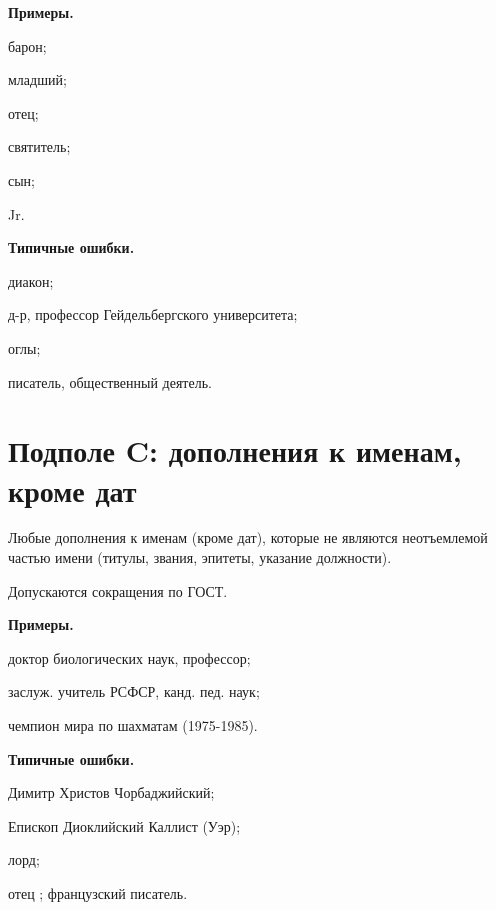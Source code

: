 \textbf{Примеры.}

\begin{cutelist}
    \item барон;
    \item младший;
    \item отец;
    \item святитель;
    \item сын;
    \item Jr.
\end{cutelist}

\textbf{Типичные ошибки.}

\begin{cutelist}
    \item диакон;
    \item д-р, профессор Гейдельбергского университета;
    \item оглы;
    \item писатель, общественный деятель.
\end{cutelist}

\section{Подполе C: дополнения к именам, кроме дат}

Любые дополнения к именам (кроме дат), которые не являются неотъемлемой частью имени (титулы, звания, эпитеты, указание должности).

Допускаются сокращения по ГОСТ.

\textbf{Примеры.}

\begin{cutelist}
    \item доктор биологических наук, профессор;
    \item заслуж. учитель РСФСР, канд. пед. наук;
    \item чемпион мира по шахматам (1975-1985).
\end{cutelist}

\textbf{Типичные ошибки.}

\begin{cutelist}
    \item Димитр Христов Чорбаджийский;
    \item Епископ Диоклийский Каллист (Уэр);
    \item лорд;
    \item отец ; французский писатель.
\end{cutelist}


